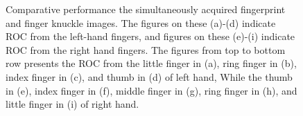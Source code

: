 \begin{figure}
    \caption{Comparative performance the simultaneously acquired fingerprint and finger knuckle images. The figures on these (a)-(d) indicate ROC from the left-hand fingers, and figures on these (e)-(i) indicate ROC from the right hand fingers. The figures from top to bottom row presents the ROC from the little finger in (a), ring finger in (b), index finger in (c), and thumb in (d) of left hand, While the thumb in (e), index finger in (f), middle finger in (g),  ring finger in (h), and little finger in (i) of right hand.}
    \label{joint-performance}
\end{figure}

